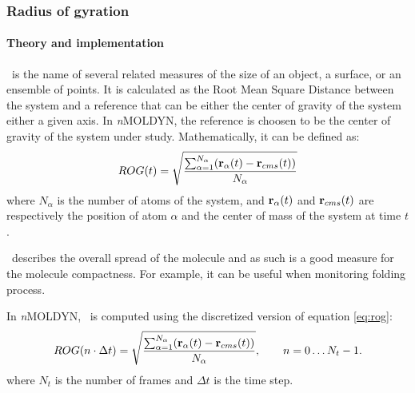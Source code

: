 \documentclass[a4paper,11pt]{report}
\newcommand{\NMOLDYN}{\textit{n}MOLDYN}
\begin{document}
\subsubsection{Radius of gyration}
\label{rog}
\paragraph{Theory and implementation\\}
\label{rog_theory}
\ROG\ is the name of several related measures of the size of an object, a surface, or an ensemble of 
points. It is calculated as the Root Mean Square Distance between the system and a reference that can be either 
the center of gravity of the system either a given axis. In \NMOLDYN, the reference is choosen to be the center 
of gravity of the system under study. Mathematically, it can be defined as:
\begin{equation}
\label{eq:rog}
ROG(t) = \sqrt{\frac{\sum_{\alpha = 1}^{N_{\alpha}}({\bf r}_{\alpha}(t) - {\bf r}_{cms}(t))}{N_{\alpha}}}
\end{equation}
where $N_{\alpha}$ is the number of atoms of the system, and ${\bf r}_{\alpha}(t)$ and ${\bf r}_{cms}(t)$ are 
respectively the position of atom $\alpha$ and the center of mass of the system at time $t$.

\ROG\ describes the overall spread of the molecule and as such is a good measure for the molecule compactness. For
example, it can be useful when monitoring folding process.

In \NMOLDYN, \ROG\ is computed using the discretized version of equation \ref{eq:rog}:
\begin{equation}
\label{eq:rog_num}
ROG(n\cdot\Delta t) = \sqrt{\frac{\sum_{\alpha = 1}^{N_{\alpha}}({\bf r}_{\alpha}(t) - {\bf r}_{cms}(t))}{N_{\alpha}}},
\qquad n = 0\ldots N_t - 1.
\end{equation}
where $N_t$ is the number of frames and $\Delta t$ is the time step.
\newpage
\end{document}
